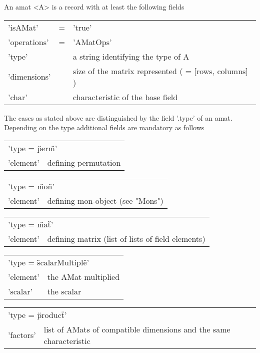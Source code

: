 \bigskip
An amat <A> is a record with at least the following fields\:\  

\bigskip
\begin{center}
\begin{tabular}{lll}
'isAMat'     & \:= & 'true'\\
'operations' & \:= & 'AMatOps'\\
'type'       & \: & a string identifying the type of A\\
'dimensions' & \: & size of the matrix represented ( = [rows, columns] )\\
'char'       & \: & characteristic of the base field
\end{tabular}    
\end{center}

The cases as stated above are distinguished by the field '.type'
of an amat. Depending on the type additional fields are mandatory
as follows\:\ 

\bigskip
\begin{tabular}{p{2.5cm}p{9cm}}
\multicolumn{2}{l}{'type = \"perm\"\:'}\\
'element'      & defining permutation
\end{tabular}

\begin{tabular}{p{2.5cm}p{9cm}}
\multicolumn{2}{l}{'type = \"mon\"\:'}\\
'element'      & defining mon-object (see "Mons")
\end{tabular}

\begin{tabular}{p{2.5cm}p{9cm}}
\multicolumn{2}{l}{'type = \"mat\"\:'}\\
'element'      & defining matrix (list of lists of field elements)
\end{tabular}

\begin{tabular}{p{2.5cm}p{9cm}}
\multicolumn{2}{l}{'type = \"scalarMultiple\"\:'}\\
'element'      & the AMat multiplied\\
'scalar'       & the scalar\\
\end{tabular}

\begin{tabular}{p{2.5cm}p{9cm}}
\multicolumn{2}{l}{'type = \"product\"\:'}\\
'factors'      & list of AMats of compatible dimensions 
and the same characteristic\\
\end{tabular}

